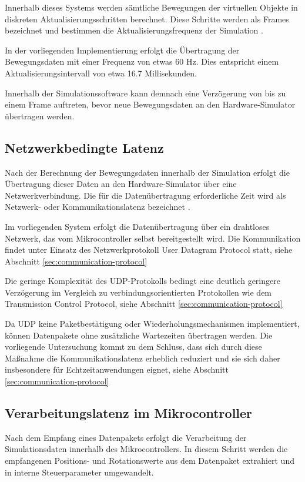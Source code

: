 Innerhalb dieses Systems werden sämtliche Bewegungen der virtuellen Objekte in diskreten Aktualisierungsschritten berechnet. Diese Schritte werden als Frames bezeichnet und bestimmen die Aktualisierungsfrequenz der Simulation \cite{Unity12}.

In der vorliegenden Implementierung erfolgt die Übertragung der Bewegungsdaten mit einer Frequenz von etwas 60 Hz. Dies entspricht einem Aktualisierungsintervall von etwa 16.7 Millisekunden.

Innerhalb der Simulationssoftware kann demnach eine Verzögerung von bis zu einem Frame auftreten, bevor neue Bewegungsdaten an den Hardware-Simulator übertragen werden.

\subsection{Netzwerkbedingte Latenz}
Nach der Berechnung der Bewegungsdaten innerhalb der Simulation erfolgt die Übertragung dieser Daten an den Hardware-Simulator über eine Netzwerkverbindung. Die für die Datenübertragung erforderliche Zeit wird als Netzwerk- oder Kommunikationslatenz bezeichnet \cite{Hou2024}.

Im vorliegenden System erfolgt die Datenübertragung über ein drahtloses Netzwerk, das vom Mikrocontroller selbst bereitgestellt wird. Die Kommunikation findet unter Einsatz des Netzwerkprotokoll User Datagram Protocol statt, siehe Abschnitt \ref{sec:communication-protocol}

Die geringe Komplexität des UDP-Protokolls bedingt eine deutlich geringere Verzögerung im Vergleich zu verbindungsorientierten Protokollen wie dem Transmission Control Protocol, siehe Abschnitt \ref{sec:communication-protocol}

Da UDP keine Paketbestätigung oder Wiederholungsmechanismen implementiert, können Datenpakete ohne zusätzliche Wartezeiten übertragen werden. Die vorliegende Untersuchung kommt zu dem Schluss, dass sich durch diese Maßnahme die Kommunikationslatenz erheblich reduziert und sie sich daher insbesondere für Echtzeitanwendungen eignet, siehe Abschnitt \ref{sec:communication-protocol}

\subsection{Verarbeitungslatenz im Mikrocontroller}
Nach dem Empfang eines Datenpakets erfolgt die Verarbeitung der Simulationsdaten innerhalb des Mikrocontrollers. In diesem Schritt werden die empfangenen Positions- und Rotationswerte aus dem Datenpaket extrahiert und in interne Steuerparameter umgewandelt.


